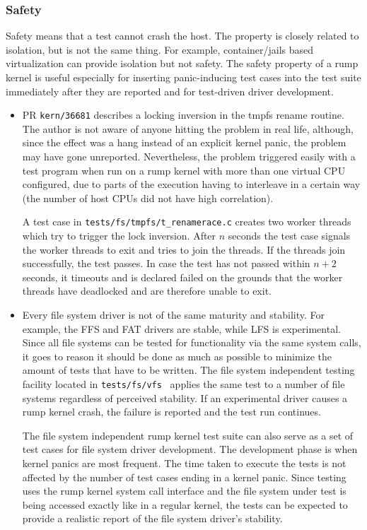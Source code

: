 \subsubsection*{Safety}

Safety means that a test cannot crash the host.  The property is
closely related to isolation, but is not the same thing.  For
example, container/jails based virtualization can provide isolation
but not safety.  The safety property of a rump kernel is useful
especially for inserting panic-inducing test cases into
the test suite immediately after they are reported and for test-driven
driver development.

\begin{itemize}
\item   PR \texttt{kern/36681} describes a locking inversion in
	the tmpfs rename routine.  The author is not aware of anyone
	hitting the problem in real life, although, since the effect
	was a hang instead of an explicit kernel panic, the problem
	may have gone unreported.  Nevertheless, the problem
	triggered easily with a test program when run on a rump
	kernel with more than one virtual CPU configured, due to
	parts of the execution having to interleave in a certain
	way (the number of host CPUs did not have high correlation).

	A test case in \verb+tests/fs/tmpfs/t_renamerace.c+ creates
	two worker threads which try to trigger the lock inversion.
	After $n$ seconds the test case signals the worker threads
	to exit and tries to join the threads.  If the threads join
	successfully, the test passes.  In case the test has not
	passed within $n+2$ seconds, it timeouts and is declared
	failed on the grounds that the worker threads have deadlocked
	and are therefore unable to exit.

\item   Every file system driver is not of the same maturity and
	stability.  For example, the FFS and FAT drivers
	are stable, while LFS is experimental.  Since all file
	systems can be tested for functionality via the same system
	calls, it goes to reason it should be done as much as
	possible to minimize the amount of tests that have to be
	written.  The file system independent testing facility
	located in \texttt{tests/fs/vfs}~\cite{njoly:vfstest}
	applies the same test to a number of file systems regardless
	of perceived stability.  If an experimental
	driver causes a rump kernel crash, the failure is reported and
	the test run continues.

	The file system independent rump kernel test suite can also
	serve as a set of test cases for file system driver
	development.  The development phase is when kernel panics are most frequent.
	The time taken to execute the tests is not affected by the
	number of test cases ending in a kernel panic.  Since
	testing uses the rump kernel system call interface and the
	file system under test is being accessed exactly like
	in a regular kernel, the tests can be expected to provide
	a realistic report of the file system driver's stability.
\end{itemize}


